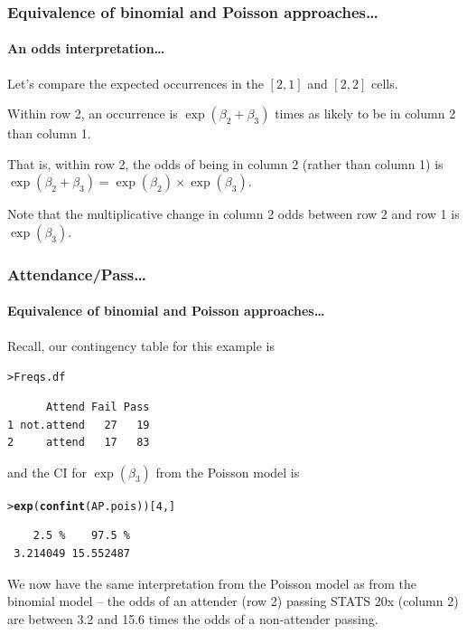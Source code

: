 \documentclass{beamer}\usepackage[]{graphicx}\usepackage[]{xcolor}
\makeatletter
\newcommand{\hlnum}[1]{\textcolor[rgb]{0.686,0.059,0.569}{#1}}%
\newcommand{\hlstd}[1]{\textcolor[rgb]{0.345,0.345,0.345}{#1}}%
\newcommand{\hlkwd}[1]{\textcolor[rgb]{0.737,0.353,0.396}{\textbf{#1}}}%
\newenvironment{kframe}{%
 \def\at@end@of@kframe{}%
 \ifinner\ifhmode%
  \def\at@end@of@kframe{\end{minipage}}%
  \begin{minipage}{\columnwidth}%
 \fi\fi%
 \def\FrameCommand##1{\hskip\@totalleftmargin \hskip-\fboxsep
 \colorbox{shadecolor}{##1}\hskip-\fboxsep
     \hskip-\linewidth \hskip-\@totalleftmargin \hskip\columnwidth}%
 \MakeFramed {\advance\hsize-\width
   \@totalleftmargin\z@ \linewidth\hsize
   \@setminipage}}%
 {\par\unskip\endMakeFramed%
 \at@end@of@kframe}
\newenvironment{knitrout}{}{} %
\makeatother
\begin{document}
\begin{frame}[fragile]
\frametitle{Equivalence of binomial and Poisson approaches\ldots}
\framesubtitle{An odds interpretation\ldots}
Let's compare the expected occurrences in the $[2,1]$ and $[2,2]$ cells.
\medskip

Within row 2, an occurrence is $\exp(\beta_2 + \beta_3)$ times as likely  to be in column 2 than column 1. 
\medskip

That is, within row 2, the odds of being in column 2 (rather than column 1) is $\exp(\beta_2 + \beta_3) = \exp(\beta_2) \times \exp(\beta_3)$.
\bigskip

Note that the multiplicative change in column 2 odds between row 2 and row 1 is $\exp(\beta_3)$. 

\end{frame}



\begin{frame}[fragile]
\frametitle{Attendance/Pass\ldots}
\framesubtitle{Equivalence of binomial and Poisson approaches\ldots}
Recall, our contingency table for this example is
\medskip
\begin{knitrout}\scriptsize
{}\color{fgcolor}\begin{kframe}
\begin{alltt}
\hlstd{> }\hlstd{Freqs.df}
\end{alltt}
\begin{verbatim}
      Attend Fail Pass
1 not.attend   27   19
2     attend   17   83
\end{verbatim}
\end{kframe}
\end{knitrout}
\medskip

and the CI for $\exp(\beta_3)$ from the Poisson model is
\medskip

\begin{knitrout}\scriptsize
{}\color{fgcolor}\begin{kframe}
\begin{alltt}
\hlstd{> }\hlkwd{exp}\hlstd{(}\hlkwd{confint}\hlstd{(AP.pois))[}\hlnum{4}\hlstd{,]}
\end{alltt}


{\ttfamily\noindent\itshape\color{messagecolor}{Waiting for profiling to be done...}}\begin{verbatim}
    2.5 %    97.5 % 
 3.214049 15.552487 
\end{verbatim}
\end{kframe}
\end{knitrout}
\bigskip

We now have the same interpretation from the Poisson model as from the binomial model --
the odds of an attender (row 2) passing STATS 20x (column 2) are between 3.2 and 15.6 times the odds of a non-attender passing.

\end{frame}
\end{document}
